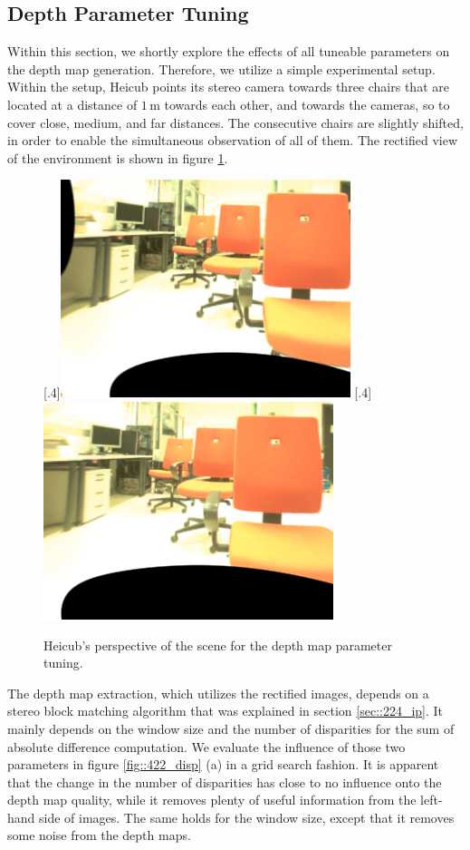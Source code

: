 \subsection{Depth Parameter Tuning}
\label{sec::422_dp}
Within this section, we shortly explore the effects of all tuneable parameters on the depth map generation. Therefore, we utilize a simple experimental setup. Within the setup, Heicub points its stereo camera towards three chairs that are located at a distance of $1\,\text{m}$ towards each other, and towards the cameras, so to cover close, medium, and far distances. The consecutive chairs are slightly shifted, in order to enable the simultaneous observation of all of them. The rectified view of the environment is shown in figure \ref{fig::422_wls_rgb}.
\begin{figure}[h!]
	\centering
	[.4\linewidth]{\includegraphics[scale=.3]{chapters/04_experiments/02_autonomous_walking/02_depth_map_parameter_tuning/l_rgb.png}}
	[.4\linewidth]{\includegraphics[scale=.3]{chapters/04_experiments/02_autonomous_walking/02_depth_map_parameter_tuning/r_rgb.png}}
	\caption{Heicub's perspective of the scene for the depth map parameter tuning.}
	\label{fig::422_wls_rgb}
\end{figure}
The depth map extraction, which utilizes the rectified images, depends on a stereo block matching algorithm that was explained in section \ref{sec::224_ip}. It mainly depends on the window size and the number of disparities for the sum of absolute difference computation. We evaluate the influence of those two parameters in figure \ref{fig::422_disp} (a) in a grid search fashion. It is apparent that the change in the number of disparities has close to no influence onto the depth map quality, while it removes plenty of useful information from the left-hand side of images. The same holds for the window size, except that it removes some noise from the depth maps.
